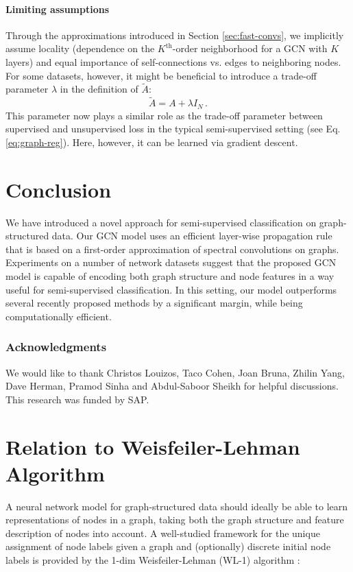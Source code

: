 \documentclass{article} %
\makeatletter
\newcommand*{\eq}{Eq.\@\xspace}
\newcommand*{\vs}{vs.\@\xspace}
\makeatother
\begin{document}
\paragraph{Limiting assumptions}
Through the approximations introduced in Section \ref{sec:fast-convs}, we implicitly assume locality (dependence on the $K^{\text{th}}$-order neighborhood for a GCN with $K$ layers) and equal importance of self-connections \vs edges to neighboring nodes. For some datasets, however, it might be beneficial to introduce a trade-off parameter $\lambda$ in the definition of $\tilde{A}$:
\begin{equation}
  \tilde{A} = A + \lambda I_N\, .
\label{eq:trade-off-param}
\end{equation}
This parameter now plays a similar role as the trade-off parameter between supervised and unsupervised loss in the typical semi-supervised setting (see \eq \ref{eq:graph-reg}). Here, however, it can be learned via gradient descent.

\section{Conclusion}
We have introduced a novel approach for semi-supervised classification on graph-structured data. Our GCN model uses an efficient layer-wise propagation rule that is based on a first-order approximation of spectral convolutions on graphs. Experiments on a number of network datasets suggest that the proposed GCN model is capable of encoding both graph structure and node features in a way useful for semi-supervised classification. In this setting, our model outperforms several recently proposed methods by a significant margin, while being computationally efficient.

\subsubsection*{Acknowledgments}

We would like to thank Christos Louizos, Taco Cohen, Joan Bruna, Zhilin Yang, Dave Herman, Pramod Sinha and Abdul-Saboor Sheikh for helpful discussions. This research was funded by SAP.





\appendix

\section{Relation to Weisfeiler-Lehman Algorithm}
\label{sec:wl}
A neural network model for graph-structured data should ideally be able to learn representations of nodes in a graph, taking both the graph structure and feature description of nodes into account. A well-studied framework for the unique assignment of node labels given a graph and (optionally) discrete initial node labels is provided by the 1-dim Weisfeiler-Lehman (WL-1) algorithm  \citep{weisfeiler1968reduction}:
\end{document}
